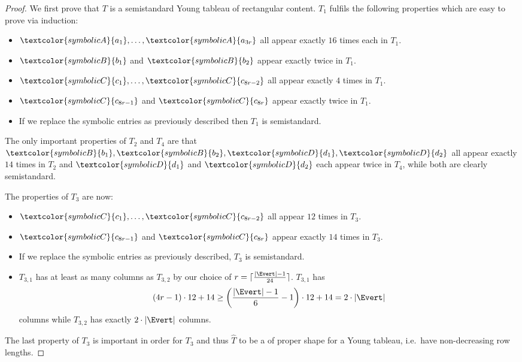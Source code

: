 \begin{proof}
    We first prove that $T$ is a semistandard Young tableau of rectangular content.
    $T_1$ fulfils the following properties which are easy to prove via induction:
    \begin{itemize}
        \item $\textcolor{symbolicA}{a_1}, \ldots, \textcolor{symbolicA}{a_{3r}}$ all appear exactly $16$ times each in $T_1$.
        \item $\textcolor{symbolicB}{b_1}$ and $\textcolor{symbolicB}{b_2}$ appear exactly twice in $T_1$.
        \item $\textcolor{symbolicC}{c_1}, \ldots, \textcolor{symbolicC}{c_{8r-2}}$ all appear exactly $4$ times in $T_1$.
        \item $\textcolor{symbolicC}{c_{8r-1}}$ and $\textcolor{symbolicC}{c_{8r}}$ appear exactly twice in $T_1$.
        \item If we replace the symbolic entries as previously described then $T_1$ is semistandard.
    \end{itemize}
    
    The only important properties of $T_2$ and $T_4$ are that $\textcolor{symbolicB}{b_1}, \textcolor{symbolicB}{b_2}, \textcolor{symbolicD}{d_1}, \textcolor{symbolicD}{d_2}$ all appear exactly $14$ times in $T_2$ and $\textcolor{symbolicD}{d_1}$ and $\textcolor{symbolicD}{d_2}$ each appear twice in $T_4$, while both are clearly semistandard.
    
    The properties of $T_3$ are now:
    \begin{itemize}
        \item $\textcolor{symbolicC}{c_1}, \ldots, \textcolor{symbolicC}{c_{8r-2}}$ all appear $12$ times in $T_3$.
        \item $\textcolor{symbolicC}{c_{8r-1}}$ and $\textcolor{symbolicC}{c_{8r}}$ appear exactly $14$ times in $T_3$.
        \item If we replace the symbolic entries as previously described, $T_3$ is semistandard.
        \item $T_{3,1}$ has at least as many columns as $T_{3,2}$ by our choice of $r = \lceil \frac{|\Evert| - 1}{24} \rceil$.
            $T_{3,1}$ has \[
                (4r-1) \cdot 12 + 14 \geq \left(\frac{|\Evert|-1}{6}-1\right)\cdot 12 + 14 = 2 \cdot |\Evert|
            \]
            columns while $T_{3,2}$ has exactly $2 \cdot |\Evert|$ columns.
    \end{itemize}
    The last property of $T_3$ is important in order for $T_3$ and thus $\hat{T}$ to be a of proper shape for a Young tableau, i.e.\ have non-decreasing row lengths.
    

\end{proof}
